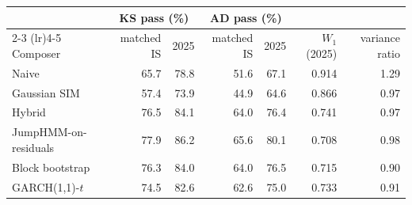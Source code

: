 \begin{tabular}{lrrrrrr}
\toprule
 & \multicolumn{2}{c}{KS pass (\%)} & \multicolumn{2}{c}{AD pass (\%)} & & \\
\cmidrule(lr){2-3} \cmidrule(lr){4-5}
Composer & matched IS & 2025 & matched IS & 2025 & $W_1$ (2025) & variance ratio \\
\midrule
Naive & 65.7 & 78.8 & 51.6 & 67.1 & 0.914 & 1.29 \\
Gaussian SIM & 57.4 & 73.9 & 44.9 & 64.6 & 0.866 & 0.97 \\
Hybrid & 76.5 & 84.1 & 64.0 & 76.4 & 0.741 & 0.97 \\
JumpHMM-on-residuals & 77.9 & 86.2 & 65.6 & 80.1 & 0.708 & 0.98 \\
Block bootstrap & 76.3 & 84.0 & 64.0 & 76.5 & 0.715 & 0.90 \\
GARCH(1,1)-$t$ & 74.5 & 82.6 & 62.6 & 75.0 & 0.733 & 0.91 \\
\bottomrule
\end{tabular}
